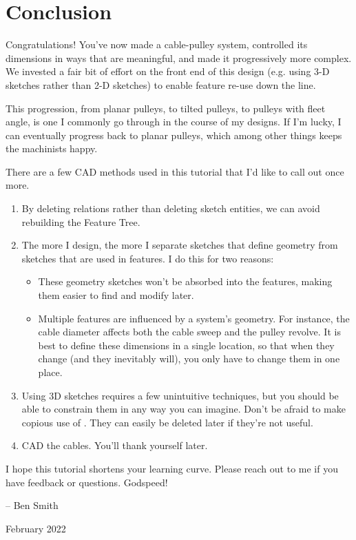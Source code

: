 \chapter{Conclusion}

Congratulations! You've now made a cable-pulley system, controlled its
dimensions in ways that are meaningful, and made it progressively more complex.
We invested a fair bit of effort on the front end of this design (e.g. using 3-D
sketches rather than 2-D sketches) to enable feature re-use down the line.

This progression, from planar pulleys, to tilted pulleys, to pulleys with fleet
angle, is one I commonly go through in the course of my designs. If I'm lucky, I
can eventually progress back to planar pulleys, which among other things keeps
the machinists happy.

There are a few CAD methods used in this tutorial that I'd like to call out once
more.

\begin{enumerate}
\item{} By deleting relations rather than deleting sketch entities, we can avoid
rebuilding the Feature Tree.
\item{} The more I design, the more I separate sketches that define geometry from
sketches that are used in features. I do this for two reasons:


\begin{itemize}
\item{} These geometry sketches won't be absorbed into the features, making them
  easier to find and modify later.
\item{} Multiple features are influenced by a system's geometry. For instance, the
  cable diameter affects both the cable sweep and the pulley revolve. It is
  best to define these dimensions in a single location, so that when they
  change (and they inevitably will), you only have to change them in one
  place.
\end{itemize}
\item{} Using 3D sketches requires a few unintuitive techniques, but you should be
able to constrain them in any way you can imagine. Don't be afraid to make
copious use of . They can easily be deleted later if they're not
useful.
\item{} CAD the cables. You'll thank yourself later.
\end{enumerate}

I hope this tutorial shortens your learning curve. Please reach out to me if you
have feedback or questions. Godspeed!

\hfill\break

-- Ben Smith

February 2022
